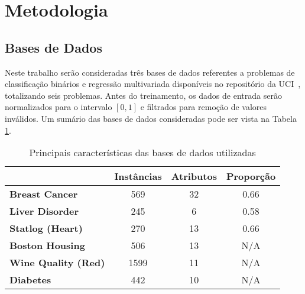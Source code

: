 \documentclass[conference]{IEEEtran}
\begin{document}
	\section{Metodologia}
	\subsection{Bases de Dados}
	Neste trabalho serão consideradas três bases de dados referentes a problemas de classificação binários e regressão multivariada disponíveis no repositório da UCI~\cite{dua2019}, totalizando seis problemas. Antes do treinamento, os dados de entrada serão normalizados para o intervalo $[0,1]$ e filtrados para remoção de valores inválidos. Um sumário das bases de dados consideradas pode ser vista na Tabela \ref{tab:datasets}.
	
	\begin{table}[thpbh]
		\caption{Principais características das bases de dados utilizadas}
		\label{tab:datasets}
		\centering
		\begin{tabular}{l|c|c|c|}
			\cline{2-4}
			& \textbf{Instâncias} & \textbf{Atributos} & \textbf{Proporção} \\ \hline
			\multicolumn{1}{|l|}{\textbf{Breast Cancer}}   & 569                 & 32                 & 0.66                           \\ \hline
			\multicolumn{1}{|l|}{\textbf{Liver Disorder}}  & 245                 & 6                  & 0.58                           \\ \hline
			\multicolumn{1}{|l|}{\textbf{Statlog (Heart)}} & 270                 & 13                 & 0.66                           \\ \hline
			\multicolumn{1}{|l|}{\textbf{Boston Housing}}  & 506                 & 13                 & N/A                            \\ \hline
			\multicolumn{1}{|l|}{\textbf{Wine Quality (Red)}}      & 1599                 & 11                 & N/A                            \\ \hline
			\multicolumn{1}{|l|}{\textbf{Diabetes}}        & 442                 & 10                 & N/A                            \\ \hline
		\end{tabular}
	\end{table}
	
\end{document}
